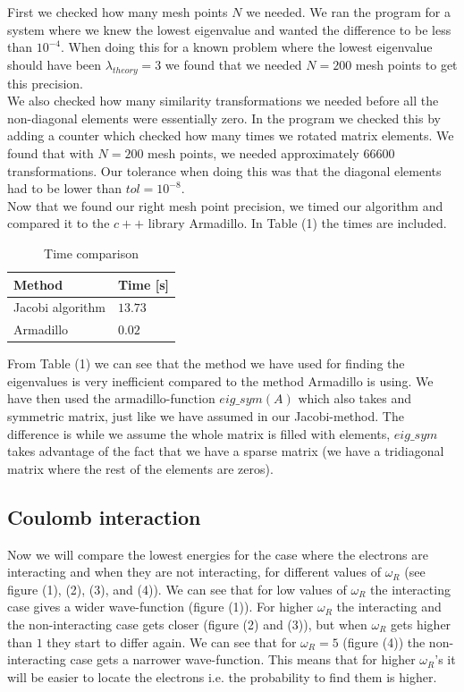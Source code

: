 \documentclass[%
 reprint,
 nobalancelastpage,
 amsmath,amssymb,
 aps,
]{revtex4-1}
\begin{document}
First we checked how many mesh points $N$ we needed. We ran the program for a system where we knew the lowest eigenvalue and wanted the difference to be less than $10^{-4}$. When doing this for a known problem where the lowest eigenvalue should have been $\lambda_{theory} = 3$ we found that we needed $N=200$ mesh points to get this precision.\\
We also checked how many similarity transformations we needed before all the non-diagonal elements were essentially zero. In the program we checked this by adding a counter which checked how many times we rotated matrix elements. We found that with $N= 200$ mesh points, we needed approximately $66600$ transformations. Our tolerance when doing this was that the diagonal elements had to be lower than $tol = 10^{-8}$.\\

Now that we found our right mesh point precision, we timed our algorithm and compared it to the $c++$ library Armadillo. In Table (1) the times are included.

\begin{table}[h]
\centering
\caption{Time comparison}
\label{my-label}
\begin{tabular}{|l|l|}
\hline
\textbf{Method}  & \textbf{Time {[}s{]}} \\ \hline
Jacobi algorithm & $13.73$               \\ \hline
Armadillo        & $0.02$                \\ \hline
\end{tabular}
\end{table}

From Table (1) we can see that the method we have used for finding the eigenvalues is very inefficient compared to the method Armadillo is using. We have then used the armadillo-function $eig\_ sym(A)$ which also takes and symmetric matrix, just like we have assumed in our Jacobi-method. The difference is while we assume the whole matrix is filled with elements, $eig\_sym$ takes advantage of the fact that we have a sparse matrix (we have a tridiagonal matrix where the rest of the elements are zeros).

\subsection{Coulomb interaction}


Now we will compare the lowest energies for the case where the electrons are interacting and when they are not interacting, for different values of $\omega_R$ (see figure (1), (2), (3), and (4)). We can see that for low values of $\omega_R$ the interacting case gives a wider wave-function (figure (1)). For higher $\omega_R$ the interacting and the non-interacting case gets closer (figure (2) and (3)), but when $\omega_R$ gets higher than $1$ they start to differ again. We can see that for $\omega_R = 5$ (figure (4)) the non-interacting case gets a narrower wave-function. This means that for higher $\omega_R$'s it will be easier to locate the electrons i.e. the probability to find them is higher. \\
\end{document}
